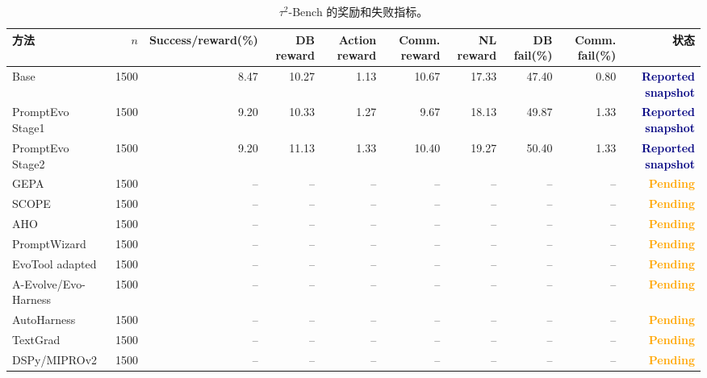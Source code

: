 \documentclass[a4paper,11pt]{article}
\newcommand{\reported}{\textcolor{navy}{\textbf{Reported snapshot}}}
\newcommand{\pending}{\textcolor{orange}{\textbf{Pending}}}
\begin{document}
\begin{CJK*}{UTF8}{gbsn}
\begin{table}[H]
\centering\scriptsize
\caption{$\tau^2$-Bench 的奖励和失败指标。}
\begin{adjustbox}{max width=\textwidth}
\begin{tabular}{lrrrrrrrrr}
\toprule
方法 & $n$ & Success/reward(\%) & DB reward & Action reward & Comm. reward & NL reward & DB fail(\%) & Comm. fail(\%) & 状态\\
\midrule
Base & 1500 & 8.47 & 10.27 & 1.13 & 10.67 & 17.33 & 47.40 & 0.80 & \reported\\
PromptEvo Stage1 & 1500 & 9.20 & 10.33 & 1.27 & 9.67 & 18.13 & 49.87 & 1.33 & \reported\\
PromptEvo Stage2 & 1500 & 9.20 & 11.13 & 1.33 & 10.40 & 19.27 & 50.40 & 1.33 & \reported\\
GEPA & 1500 & -- & -- & -- & -- & -- & -- & -- & \pending\\
SCOPE & 1500 & -- & -- & -- & -- & -- & -- & -- & \pending\\
AHO & 1500 & -- & -- & -- & -- & -- & -- & -- & \pending\\
PromptWizard & 1500 & -- & -- & -- & -- & -- & -- & -- & \pending\\
EvoTool adapted & 1500 & -- & -- & -- & -- & -- & -- & -- & \pending\\
A-Evolve/Evo-Harness & 1500 & -- & -- & -- & -- & -- & -- & -- & \pending\\
AutoHarness & 1500 & -- & -- & -- & -- & -- & -- & -- & \pending\\
TextGrad & 1500 & -- & -- & -- & -- & -- & -- & -- & \pending\\
DSPy/MIPROv2 & 1500 & -- & -- & -- & -- & -- & -- & -- & \pending\\
\bottomrule
\end{tabular}
\end{adjustbox}
\end{table}


\end{CJK*}
\end{document}
